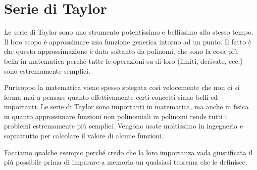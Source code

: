 \section{Serie di Taylor}
Le serie di Taylor sono uno strumento potentissimo e bellissimo allo stesso 
tempo. Il loro scopo è approssimare una funzione generica intorno ad un punto. 
Il fatto è che questa approssimazione è data soltanto da polinomi, che sono la 
cosa più bella in matematica perché tutte le operazioni su di loro (limiti, 
derivate, ecc.) sono estremamente semplici. 

Purtroppo la matematica viene spesso spiegata così velocemente che non ci si 
ferma mai a pensare quanto effettivamente certi concetti siano belli ed 
importanti. Le serie di Taylor sono importanti in matematica, ma anche in 
fisica in quanto approssimare funzioni non polinomiali in polinomi rende tutti 
i problemi estremamente più semplici. Vengono usate moltissimo in ingegneria e 
soprattutto per calcolare il valore di alcune funzioni. 

Facciamo qualche esempio perché credo che la loro importanza vada giustificata 
il più possibile prima di imparare a memoria un qualsiasi teorema che le 
definisce:

